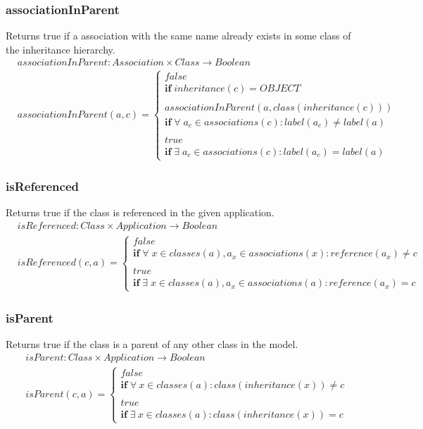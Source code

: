 \documentclass[10pt]{article}
\begin{document}
\subsubsection{associationInParent}
Returns true if a association with the same name already exists in some class of the inheritance hierarchy.
\begin{align}
& associationInParent: Association \times Class \rightarrow Boolean \\
& associationInParent(a, c) = \begin{cases}
 false \\
 \mathbf{if} \; inheritance(c) = OBJECT \\ \\
 associationInParent(a, class(inheritance(c))) \\
 \mathbf{if} \; \forall \; a_c \in associations(c) : label(a_c) \neq label(a) \\ \\
 true \\
 \mathbf{if} \; \exists \; a_c \in associations(c) : label(a_c) = label(a) 
 \end{cases}
\end{align}

\subsubsection{isReferenced}
Returns true if the class is referenced in the given application.
\begin{align}
& isReferenced: Class \times Application \rightarrow Boolean \\
& isReferenced(c, a) = \begin{cases}
 false \\
 \mathbf{if} \; \forall \; x \in classes(a), a_x \in associations(x) : reference(a_x) \neq c \\ \\
 true \\
 \mathbf{if} \; \exists \; x \in classes(a), a_x \in associations(a) : reference(a_x) = c 
 \end{cases}
\end{align}

\subsubsection{isParent}
Returns true if the class is a parent of any other class in the model.
\begin{align}
& isParent: Class \times Application \rightarrow Boolean \\
& isParent(c, a) = \begin{cases}
 false \\
 \mathbf{if} \; \forall \: x \in classes(a) : class(inheritance(x)) \neq c \\\\
 true \\
  \mathbf{if} \; \exists \: x \in classes(a) : class(inheritance(x)) = c
 \end{cases}
\end{align}
\end{document}
